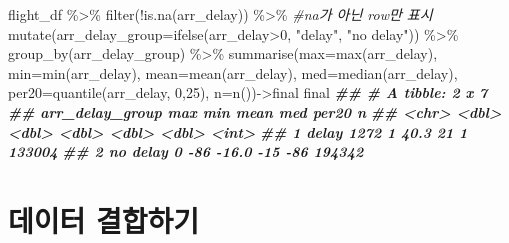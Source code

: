 \documentclass[
]{book}
\newenvironment{Shaded}{\begin{snugshade}}{\end{snugshade}}
\newcommand{\AttributeTok}[1]{\textcolor[rgb]{0.77,0.63,0.00}{#1}}
\newcommand{\CommentTok}[1]{\textcolor[rgb]{0.56,0.35,0.01}{\textit{#1}}}
\newcommand{\DecValTok}[1]{\textcolor[rgb]{0.00,0.00,0.81}{#1}}
\newcommand{\DocumentationTok}[1]{\textcolor[rgb]{0.56,0.35,0.01}{\textbf{\textit{#1}}}}
\newcommand{\FunctionTok}[1]{\textcolor[rgb]{0.00,0.00,0.00}{#1}}
\newcommand{\NormalTok}[1]{#1}
\newcommand{\OtherTok}[1]{\textcolor[rgb]{0.56,0.35,0.01}{#1}}
\newcommand{\SpecialCharTok}[1]{\textcolor[rgb]{0.00,0.00,0.00}{#1}}
\newcommand{\StringTok}[1]{\textcolor[rgb]{0.31,0.60,0.02}{#1}}
\theoremstyle{definition}
\theoremstyle{definition}
\theoremstyle{definition}
\theoremstyle{definition}
\theoremstyle{remark}
\begin{document}
\begin{Shaded}
\begin{Highlighting}[]
\NormalTok{flight\_df }\SpecialCharTok{\%\textgreater{}\%}
  \FunctionTok{filter}\NormalTok{(}\SpecialCharTok{!}\FunctionTok{is.na}\NormalTok{(arr\_delay)) }\SpecialCharTok{\%\textgreater{}\%}  \CommentTok{\#na가 아닌 row만 표시}
  \FunctionTok{mutate}\NormalTok{(}\AttributeTok{arr\_delay\_group=}\FunctionTok{ifelse}\NormalTok{(arr\_delay}\SpecialCharTok{\textgreater{}}\DecValTok{0}\NormalTok{, }\StringTok{"delay"}\NormalTok{, }\StringTok{"no delay"}\NormalTok{)) }\SpecialCharTok{\%\textgreater{}\%} 
  \FunctionTok{group\_by}\NormalTok{(arr\_delay\_group) }\SpecialCharTok{\%\textgreater{}\%} 
  \FunctionTok{summarise}\NormalTok{(}\AttributeTok{max=}\FunctionTok{max}\NormalTok{(arr\_delay),}
            \AttributeTok{min=}\FunctionTok{min}\NormalTok{(arr\_delay), }
            \AttributeTok{mean=}\FunctionTok{mean}\NormalTok{(arr\_delay), }
            \AttributeTok{med=}\FunctionTok{median}\NormalTok{(arr\_delay), }
            \AttributeTok{per20=}\FunctionTok{quantile}\NormalTok{(arr\_delay, }\DecValTok{0}\NormalTok{,}\DecValTok{25}\NormalTok{),}
            \AttributeTok{n=}\FunctionTok{n}\NormalTok{())}\OtherTok{{-}\textgreater{}}\NormalTok{final}
\NormalTok{final}
\DocumentationTok{\#\# \# A tibble: 2 x 7}
\DocumentationTok{\#\#   arr\_delay\_group   max   min  mean   med per20      n}
\DocumentationTok{\#\#   \textless{}chr\textgreater{}           \textless{}dbl\textgreater{} \textless{}dbl\textgreater{} \textless{}dbl\textgreater{} \textless{}dbl\textgreater{} \textless{}dbl\textgreater{}  \textless{}int\textgreater{}}
\DocumentationTok{\#\# 1 delay            1272     1  40.3    21     1 133004}
\DocumentationTok{\#\# 2 no delay            0   {-}86 {-}16.0   {-}15   {-}86 194342}
\end{Highlighting}
\end{Shaded}

\hypertarget{uxb370uxc774uxd130-uxacb0uxd569uxd558uxae30}{%
\section{데이터 결합하기}\label{uxb370uxc774uxd130-uxacb0uxd569uxd558uxae30}}
\end{document}
